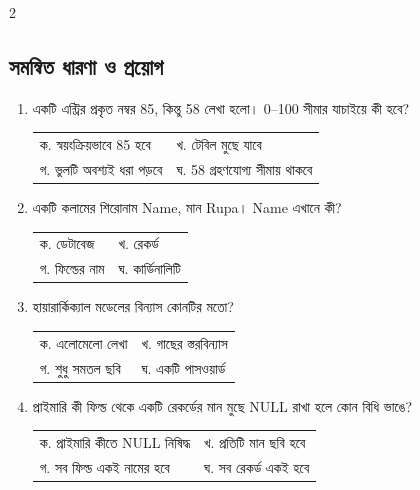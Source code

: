 \begin{multicols}{2}
\subsection{সমন্বিত ধারণা ও প্রয়োগ}
\begin{enumerate}[resume]
\item \begin{minipage}[t]{\linewidth}
একটি এন্ট্রির প্রকৃত নম্বর 85, কিন্তু 58 লেখা হলো। 0--100 সীমার যাচাইয়ে কী হবে?
\par
\begin{tabularx}{\linewidth}{@{}X X@{}}
ক. স্বয়ংক্রিয়ভাবে 85 হবে & খ. টেবিল মুছে যাবে \\
গ. ভুলটি অবশ্যই ধরা পড়বে & ঘ. 58 গ্রহণযোগ্য সীমায় থাকবে \\
\end{tabularx}
\end{minipage}
\vspace{1pt}
\item \begin{minipage}[t]{\linewidth}
একটি কলামের শিরোনাম Name, মান Rupa। Name এখানে কী?
\par
\begin{tabularx}{\linewidth}{@{}X X@{}}
ক. ডেটাবেজ & খ. রেকর্ড \\
গ. ফিল্ডের নাম & ঘ. কার্ডিনালিটি \\
\end{tabularx}
\end{minipage}
\vspace{1pt}
\item \begin{minipage}[t]{\linewidth}
হায়ারার্কিক্যাল মডেলের বিন্যাস কোনটির মতো?
\par
\begin{tabularx}{\linewidth}{@{}X X@{}}
ক. এলোমেলো লেখা & খ. গাছের স্তরবিন্যাস \\
গ. শুধু সমতল ছবি & ঘ. একটি পাসওয়ার্ড \\
\end{tabularx}
\end{minipage}
\vspace{1pt}
\item \begin{minipage}[t]{\linewidth}
প্রাইমারি কী ফিল্ড থেকে একটি রেকর্ডের মান মুছে NULL রাখা হলে কোন বিধি ভাঙে?
\par
\begin{tabularx}{\linewidth}{@{}X X@{}}
ক. প্রাইমারি কীতে NULL নিষিদ্ধ & খ. প্রতিটি মান ছবি হবে \\
গ. সব ফিল্ড একই নামের হবে & ঘ. সব রেকর্ড একই হবে \\

\end{tabularx}
\end{minipage}
\end{enumerate}
\end{multicols}
